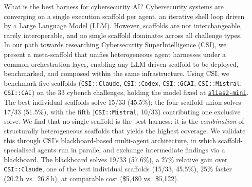 \documentclass[9pt]{extarticle}
\DeclareRobustCommand{\aliasmini}{\texorpdfstring{\href{https://aliasrobotics.com/aliasLLMs.php}{\textcolor{cai_primary}{\texttt{alias2-mini}}}}{alias2-mini}}
\renewenvironment{abstract}{%
  \small
  \noindent\ignorespaces
}{%
  \par
}
\begin{document}
\begin{abstract}
What is the best harness for cybersecurity AI? Cybersecurity systems are converging on a single execution scaffold per agent, an iterative shell loop driven by a Large Language Model (LLM). However, scaffolds are not interchangeable, rarely interoperable, and no single scaffold dominates across all challenge types. In our path towards researching Cybersecurity SuperIntelligence (CSI), we present a meta-scaffold that unifies heterogeneous agent harnesses under a common orchestration layer, enabling any LLM-driven scaffold to be deployed, benchmarked, and composed within the same infrastructure. Using CSI, we benchmark five scaffolds (\texttt{CSI::Claude}, \texttt{CSI::Codex}, \texttt{CSI::GCAI}, \texttt{CSI::Mistral}, \texttt{CSI::CAI}) on the 33 cybench challenges, holding the model fixed at \aliasmini{}. The best individual scaffolds solve 15/33 (45.5\%); the four-scaffold union solves 17/33 (51.5\%), with the fifth (\texttt{CSI::Mistral}, 10/33) contributing one exclusive solve. We find that no single scaffold is the best harness: it is the \emph{combination} of structurally heterogeneous scaffolds that yields the highest coverage. We validate this through CSI's blackboard-based multi-agent architecture, in which scaffold-specialised agents run in parallel and exchange intermediate findings via a blackboard. The blackboard solves 19/33 (57.6\%), a 27\% relative gain over \texttt{CSI::Claude}, one of the best individual scaffolds (15/33, 45.5\%), 25\% faster (20.2\,h vs.\ 26.8\,h), at comparable cost (\$5,480 vs.\ \$5,122).
\end{abstract}
\vspace{1.0em}
\end{document}
